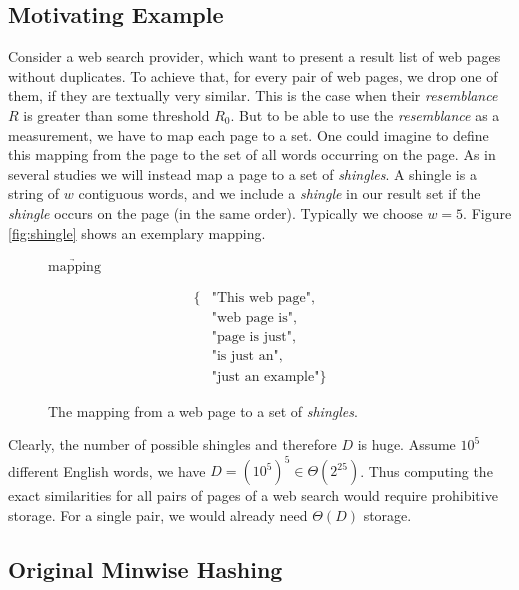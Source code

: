 \documentclass[a4paper]{article}
\begin{document}
\subsection{Motivating Example}
Consider a web search provider, which want to present a result list of web pages without duplicates. To achieve that, for every pair of web pages, we drop one of them, if they are textually very similar. This is the case when their \emph{resemblance} $R$ is greater than some threshold $R_0$. But to be able to use the \emph{resemblance} as a measurement, we have to map each page to a set. One could imagine to define this mapping from the page to the set of all words occurring on the page. As in several studies \citep{Broder:1998,BroderGMZ97} we will instead map a page to a set of \emph{shingles}. A shingle is a string of $w$ contiguous words, and we include a \emph{shingle} in our result set if the \emph{shingle} occurs on the page (in the same order). Typically we choose $w = 5$. Figure \vref{fig:shingle} shows an exemplary mapping.

\begin{figure}[h]
\begin{center}
\hspace{1cm} $\underrightarrow{\text{mapping}}$ \hspace{1cm}
\parbox{2cm}{
\begin{equation*}
\begin{split}
 \text{\{} & \text{"This web page"},\\ & \text{"web page is"},\\ & \text{"page is just"},\\ & \text{"is just an"},\\ & \text{"just an example"} \text{\}}
\end{split}
\end{equation*}
}
\end{center}
\caption{The mapping from a web page to a set of \emph{shingles}.}
\label{fig:shingle}
\end{figure}

Clearly, the number of possible shingles and therefore $D$ is huge. Assume $10^5$ different English words, we have $D=\left(10^5\right)^5 \in \Theta\left(2^{25}\right)$. Thus computing the exact similarities for all pairs of pages of a web search would require prohibitive storage. For a single pair, we would already need $\Theta(D)$ storage.

\subsection{Original Minwise Hashing}
\end{document}
